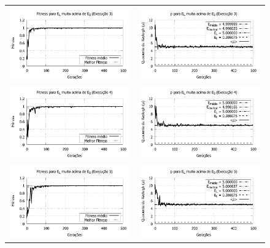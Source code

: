 \begin{figure}[htbp]
\begin{tabular}{@{}cc@{}}
		\includegraphics[width=.49\textwidth]{figs/resultados/variandoEL/T3E3_fitness.pdf} &
    \includegraphics[width=.49\textwidth]{figs/resultados/variandoEL/T3E3_rho.pdf}   \\
		
		\includegraphics[width=.49\textwidth]{figs/resultados/variandoEL/T3E4_fitness.pdf} &
    \includegraphics[width=.49\textwidth]{figs/resultados/variandoEL/T3E4_rho.pdf}   \\
		
		\includegraphics[width=.49\textwidth]{figs/resultados/variandoEL/T3E5_fitness.pdf} &
    \includegraphics[width=.49\textwidth]{figs/resultados/variandoEL/T3E5_rho.pdf}
		

\end{tabular}
\end{figure}
